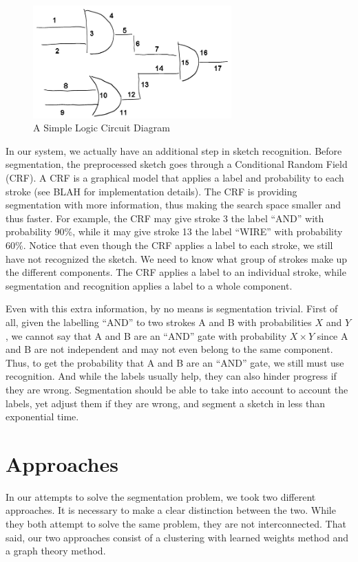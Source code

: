 \documentclass[10pt]{acmsiggraph}               %
\begin{document}
\begin{figure}[h]
\centering
\includegraphics[width=3.0in]{nums.png}%
\caption{A Simple Logic Circuit Diagram}
\label{fig:simple}
\end{figure}

In our system, we actually have an additional step in sketch recognition.
Before segmentation, the preprocessed sketch goes through a Conditional Random Field (CRF).
A CRF is a graphical model that applies a label and probability to each stroke (see BLAH for implementation details).
The CRF is providing segmentation with more information, thus making the search space smaller and thus faster.
For example, the CRF may give stroke 3 the label ``AND'' with probability 90\%, while it may give stroke 13 the label ``WIRE'' with probability 60\%.
Notice that even though the CRF applies a label to each stroke, we still have not recognized the sketch.
We need to know what group of strokes make up the different components.
The CRF applies a label to an individual stroke, while segmentation and recognition applies a label to a whole component. 

Even with this extra information, by no means is segmentation trivial.
First of all, given the labelling ``AND'' to two strokes A and B with probabilities $X$ and $Y$, we cannot say that A and B are an ``AND'' gate with probability $X \times Y$ since A and B are not independent and may not even belong to the same component.
Thus, to get the probability that A and B are an ``AND'' gate, we still must use recognition.
And while the labels usually help, they can also hinder progress if they are wrong.
Segmentation should be able to take into account to account the labels, yet adjust them if they are wrong, and segment a sketch in less than exponential time.

\section{Approaches}
In our attempts to solve the segmentation problem, we took two different approaches.
It is necessary to make a clear distinction between the two.
While they both attempt to solve the same problem, they are not interconnected.
That said, our two approaches consist of a clustering with learned weights method and a graph theory method.
\end{document}
